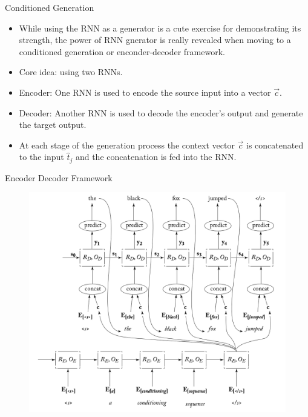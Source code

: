 \documentclass[handout]{beamer}
\begin{document}
\begin{frame}{Conditioned Generation}
\begin{scriptsize}
\begin{itemize}
\item While using the RNN as a generator is a cute exercise for demonstrating its strength, the power of RNN gnerator is really revealed when moving to a conditioned generation or enconder-decoder framework.
\item Core idea: using two RNNs.
\item Encoder: One RNN is used to encode the source input into a vector $\overrightarrow{c}$.
\item Decoder: Another RNN is used to decode the encoder's output and generate the target output.
\item At each stage of the generation process the context vector $\overrightarrow{c}$ is concatenated to the input $\hat{t}_j$ and the concatenation is fed into the RNN.
\end{itemize}
\end{scriptsize}
\end{frame}


\begin{frame}{Encoder Decoder Framework}
         \begin{figure}[h]
        	\includegraphics[scale = 0.32]{pics/seqseq.png}
        \end{figure}  
\end{frame}
\end{document}

